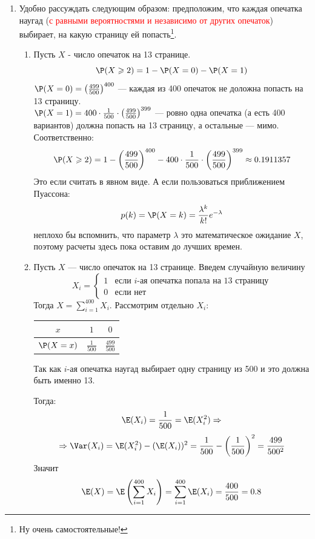 \begin{enumerate}
\item
Удобно рассуждать следующим образом: предположим, что каждая опечатка наугад (\textcolor{red}{с равными вероятностями и независимо от других опечаток}) выбирает, на какую страницу ей попасть\footnote[1]{Ну очень самостоятельные!}.

\begin{enumerate}
\item Пусть $X$ - число опечаток на 13 странице. \[\P(X \geqslant 2) = 1 - \P(X=0) - \P(X=1) \]
$\P(X=0) = \left( \frac{499}{500} \right)^{400}$ — каждая из 400 опечаток не доложна попасть на 13 страницу.\\
$\P(X=1) = 400\cdot\frac{1}{500}\cdot\left( \frac{499}{500} \right)^{399}$ — ровно одна опечатка (а есть 400 вариантов) должна попасть на 13 страницу, а остальные — мимо. Соответственно:
\[
\P(X \geqslant 2) = 1 - \left( \frac{499}{500} \right)^{400} - 400\cdot\frac{1}{500}\cdot\left( \frac{499}{500} \right)^{399} \approx 0.1911357
\]
Это если считать в явном виде. А если пользоваться приближением Пуассона:
\[
p(k) = \P(X = k) = \frac{\lambda^k}{k!}e^{-\lambda}
\]
неплохо бы вспомнить, что параметр $\lambda$ это математическое ожидание $X$, поэтому расчеты здесь пока оставим до лучших времен.

\item Пусть $X$ — число опечаток на 13 странице. Введем случайную величину
\[X_i =
\begin{cases}
1 & \text{если } i\text{-ая опечатка попала на 13 страницу}\\
0 & \text{если нет}
\end{cases}
\]
Тогда $X = \sum\limits_{i=1}^{400}X_i$. Рассмотрим отдельно $X_i$:

\begin{tabular}{@{}ccc@{}}
\toprule
$x$         & $1$             & $0$               \\ \midrule
$\P(X=x)$ & $\frac{1}{500}$ & $\frac{499}{500}$ \\ \bottomrule
\end{tabular}

Так как $i$-ая опечатка наугад выбирает одну страницу из 500 и это должна быть именно 13.

Тогда:
\[
\E(X_i) = \frac{1}{500} = \E(X^2_i) \Rightarrow
\]
\[
\Rightarrow \Var(X_i) = \E(X^2_i) - (\E(X_i))^2 = \frac{1}{500} - \left(\frac{1}{500}\right)^2 = \frac{499}{500^2}
\]
Значит
\[
\E(X) = \E\left(\sum\limits_{i=1}^{400}X_i\right) = \sum\limits_{i=1}^{400}\E(X_i)  = \frac{400}{500} = 0.8
\]


\end{enumerate}
\end{enumerate}

